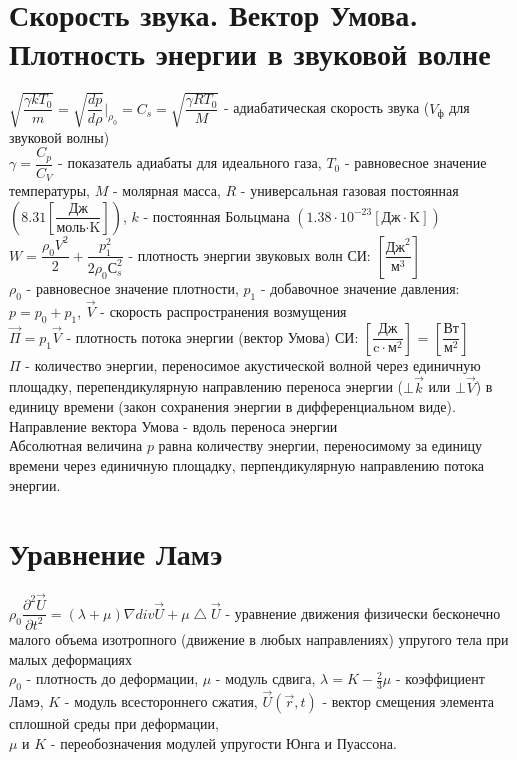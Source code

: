 \begin{multicols*}{2}
		\section{Скорость звука. Вектор Умова. Плотность энергии в звуковой волне}
		$\sqrt{\dfrac{\gamma k T_0}{m}} = \sqrt{\dfrac{dp}{d\rho}}\bigg|_{\rho_0} = C_s = \sqrt{\dfrac{\gamma R T_0}{M}}$ - адиабатическая скорость звука ($V_\text{ф}$ для звуковой волны)\\
		$\gamma = \dfrac{C_p}{C_V}$ - показатель адиабаты для идеального газа, $T_0$ - равновесное значение температуры, $M$ - молярная масса, $R$ - универсальная газовая постоянная $\left(8.31 \left[\dfrac{\text{Дж}}{\text{моль}\cdot\text{K}}\right]\right)$, $k$ - постоянная Больцмана $\left(1.38\cdot10^{-23} \left[{\text{Дж}} \cdot \text{K}\right]\right)$\\
		$W = \dfrac{\rho_0 V^2}{2} + \dfrac{p_1^2}{2\rho_0 С_s^2}$ - плотность энергии звуковых волн \quad СИ: $\left[\dfrac{\text{Дж}^2}{\text{м}^3}\right]$\\
		$\rho_0$ - равновесное значение плотности, $p_1$ - добавочное значение давления: $p = p_0 + p_1$, $\vec{V}$ - скорость распространения возмущения\\
		$\vec\Pi = p_1 \vec{V}$ - плотность потока энергии (вектор Умова) \quad СИ: $\left[\dfrac{\text{Дж}}{\text{c}\cdot \text{м}^2}\right]$ = $\left[\dfrac{\text{Вт}}{\text{м}^2}\right]$\\
		$\Pi$ - количество энергии, переносимое акустической волной через единичную площадку, перепендикулярную направлению переноса энергии ($\bot \vec{k}$ или $\bot \vec{V}$) в единицу времени (закон сохранения энергии в дифференциальном виде). Направление вектора Умова - вдоль переноса энергии\\
		Абсолютная величина $p$ равна количеству энергии, переносимому за единицу времени через единичную площадку, перпендикулярную направлению потока энергии.

		\section{Уравнение Ламэ}
		$\rho_0 \dfrac{\partial^2 \vec{U}}{\partial t^2} = (\lambda + \mu) \nabla div \vec{U} + \mu \bigtriangleup  \vec{U}$ - уравнение движения физически бесконечно малого объема изотропного (движение в любых направлениях) упругого тела при малых деформациях\\
		$\rho_0$ - плотность до деформации, $\mu$ - модуль сдвига, $\lambda = K - \frac{2}{3}\mu$ - коэффициент Ламэ, $K$ - модуль всестороннего сжатия, $\vec{U}(\vec{r}, t)$ - вектор смещения элемента сплошной среды при деформации,\\
		$\mu$ и $K$ - переобозначения модулей упругости Юнга и Пуассона.


\end{multicols*}
